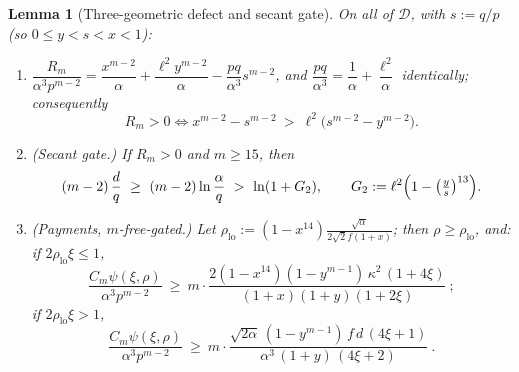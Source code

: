\documentclass[11pt]{article}
\newtheorem{lemma}[theorem]{Lemma}
\begin{document}
\begin{lemma}[Three-geometric defect and secant gate]\label{lem:threegeo}
On all of $\mathcal D$, with $s:=q/p$ (so $0\le y<s<x<1$):
\begin{enumerate}[label=\textup{(\roman*)}]
\item $\dfrac{R_m}{\alpha^3p^{m-2}}
=\dfrac{x^{m-2}}\alpha+\dfrac{\ell^2y^{m-2}}\alpha-\dfrac{pq}{\alpha^3}s^{m-2}$,
and $\dfrac{pq}{\alpha^3}=\dfrac1\alpha+\dfrac{\ell^2}\alpha$ identically;
consequently
\[
        R_m>0
        \iff
        x^{m-2}-s^{m-2}\ >\ \ell^2\bigl(s^{m-2}-y^{m-2}\bigr).
\]
\item (Secant gate.)  If $R_m>0$ and $m\ge15$, then
\[
        (m-2)\,\frac dq\ \ge\ (m-2)\ln\frac\alpha q\ >\ \ln(1+G_2),
        \qquad
        G_2:=\ell^2\Bigl(1-\bigl(\tfrac ys\bigr)^{13}\Bigr).
\]
\item (Payments, $m$-free-gated.)  Let
$\rho_{\mathrm{lo}}:=(1-x^{14})\frac{\sqrt\alpha}{2\sqrt2f(1+x)}$; then
$\rho\ge\rho_{\mathrm{lo}}$, and:
if $2\rho_{\mathrm{lo}}\xi\le1$,
\[
        \frac{C_m\psi(\xi,\rho)}{\alpha^3p^{m-2}}
        \ \ge\ m\cdot
        \frac{2(1-x^{14})(1-y^{m-1})\,\kappa^2\,(1+4\xi)}
        {(1+x)(1+y)(1+2\xi)}\ ;
\]
if $2\rho_{\mathrm{lo}}\xi>1$,
\[
        \frac{C_m\psi(\xi,\rho)}{\alpha^3p^{m-2}}
        \ \ge\ m\cdot
        \frac{\sqrt{2\alpha}\,(1-y^{m-1})\,f\,d\,(4\xi+1)}
        {\alpha^3\,(1+y)\,(4\xi+2)}\ .
\]
\end{enumerate}
\end{lemma}
\end{document}
